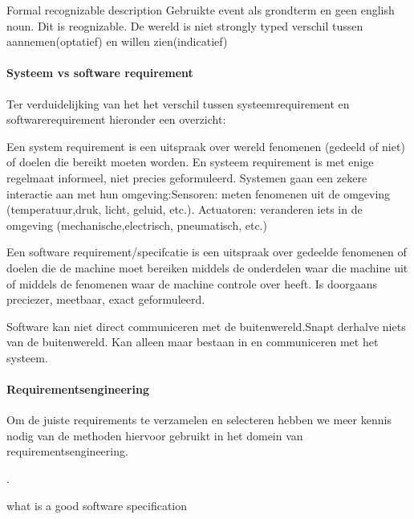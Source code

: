 \documentclass{article}
\begin{document}
	Formal recognizable description
	Gebruikte event als grondterm en geen english noun. Dit is reognizable.
	De wereld is niet strongly typed
	verschil tussen aannemen(optatief) en willen zien(indicatief)
	
	
	
	
	\paragraph{Systeem vs software requirement}
	Ter verduidelijking van het het verschil tussen systeemrequirement en softwarerequirement hieronder een overzicht:
	
	
	Een system requirement is een uitspraak over wereld fenomenen (gedeeld of niet) of doelen
	die bereikt moeten worden. En systeem requirement is met enige regelmaat informeel, niet precies geformuleerd.
	Systemen gaan een zekere interactie aan met hun omgeving:Sensoren: meten fenomenen uit de omgeving (temperatuur,druk, licht, geluid, etc.). Actuatoren: veranderen iets in de omgeving (mechanische,electrisch, pneumatisch, etc.)
	
	Een software requirement/specifcatie is een uitspraak over gedeelde fenomenen of doelen die de machine
	moet bereiken middels de onderdelen waar die machine uit of middels de fenomenen waar de machine controle
	over heeft. Is doorgaans preciezer, meetbaar, exact geformuleerd.
	
	Software kan niet direct communiceren met de buitenwereld.Snapt derhalve niets van de buitenwereld. Kan alleen maar bestaan in en communiceren met het systeem.
	
	
	\paragraph{Requirementsengineering}
	
	Om de juiste requirements te verzamelen en selecteren hebben we meer kennis nodig van de methoden hiervoor gebruikt in het domein van requirementsengineering.
	\cite{jonkerTreurKlush200informativeAgents}
	\cite{boehmBoseLeeRequirementsNegotiations}
	\cite{muHungJinLiu2013inconsistencyReqs}
	\cite{hunterNuseibeh1996manageSpecs}
	
	\cite{zavePamela4darkCorners}
	\cite{zavePAmela1997regEngineering}.
	
	
	what is a good software specification
	
\end{document}

